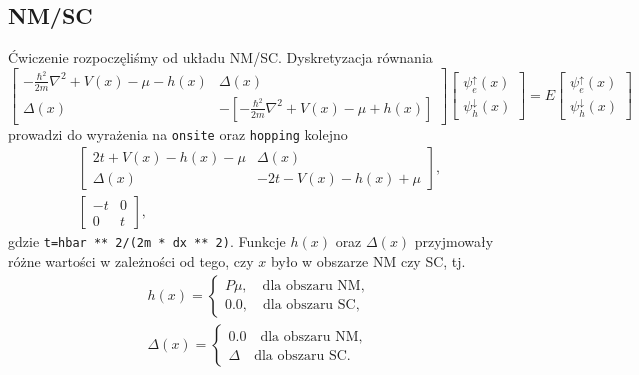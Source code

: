 \documentclass{article}
\begin{document}
\subsection{NM/SC}
Ćwiczenie rozpoczęliśmy od układu NM/SC.
Dyskretyzacja równania
\begin{equation}
    \begin{bmatrix}
        -\frac{\hbar^2}{2m}{\nabla^2}+V(x)-\mu-h(x) & \Delta(x)\\
        \Delta (x) & -\left[-\frac{\hbar^2}{2m}\nabla^2+V(x)-\mu+h(x)\right]
    \end{bmatrix}
        \begin{bmatrix}
            \psi_{e}^{\uparrow}(x)\\
            \psi^{\downarrow}_{h}(x)
        \end{bmatrix}
        =
        E
        \begin{bmatrix}
            \psi^{\uparrow}_e(x)\\
            \psi_{h}^{\downarrow}(x)
        \end{bmatrix}
\end{equation}
prowadzi do wyrażenia na \texttt{onsite} oraz \texttt{hopping} kolejno
\begin{gather}
    \begin{bmatrix}
        2t + V(x) - h(x) - \mu & \Delta(x)\\
        \Delta(x) & -2t - V(x) - h(x)+\mu
    \end{bmatrix},\\
    \begin{bmatrix}
        -t & 0 \\
        0 & t
    \end{bmatrix},
\end{gather}
gdzie \texttt{t=hbar ** 2/(2m * dx ** 2)}.
Funkcje $h(x)$ oraz $\Delta(x)$ przyjmowały różne wartości w zależności od tego, czy $x$ było w obszarze NM czy SC, tj.
\begin{gather}
    h(x) = \begin{cases}
        P\mu, \quad \text{dla obszaru NM},\\
        0.0, \quad \text{dla obszaru SC},
    \end{cases}\\
    \Delta(x) = \begin{cases}
        0.0 \quad \text{dla obszaru NM},\\
        \Delta \quad \text{dla obszaru SC.}
    \end{cases}
\end{gather}
\end{document}
